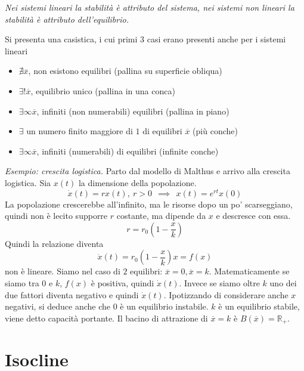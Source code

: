 \textit{Nei sistemi lineari la stabilità è attributo del sistema, nei sistemi non lineari la stabilità è attributo dell'equilibrio.}

Si presenta una casistica, i cui primi $3$ casi erano presenti anche per i sistemi lineari
\begin{itemize}
	\item $\nexists \overline{x}$, non esistono equilibri (pallina su superficie obliqua)
	\item $\exists !\overline{x}$, equilibrio unico (pallina in una conca)
	\item $\exists \infty \overline{x}$, infiniti (non numerabili) equilibri (pallina in piano)
	\item $\exists $ un numero finito maggiore di $1$ di equilibri $\overline{x}$ (più conche)
	\item $\exists \infty \overline{x}$, infiniti (numerabili) di equilibri (infinite conche)
\end{itemize}

\textit{Esempio: crescita logistica. }Parto dal modello di Malthus e arrivo alla crescita logistica. Sia $x(t)$ la dimensione della popolazione.
\begin{equation*}
	\dot{x}(t) =rx(t) ,\ r >0\ \ \implies \ \ x(t) =e^{rt} x(0)
\end{equation*}
La popolazione crescerebbe all'infinito, ma le risorse dopo un po' scarseggiano, quindi non è lecito supporre $r$ costante, ma dipende da $x$ e descresce con essa.
\begin{equation*}
	r=r_0\left(1-\frac{x}{k}\right)
\end{equation*}
Quindi la relazione diventa
\begin{equation*}
	\dot{x}(t) =r_0\left(1-\frac{x}{k}\right) x=f(x)
\end{equation*}
non è lineare. Siamo nel caso di $2$ equilibri: $\overline{x} =0,\overline{x} =k$. Matematicamente se siamo tra $0$ e $k$, $f(x)$ è positiva, quindi $\dot{x}(t)$. Invece se siamo oltre $k$ uno dei due fattori diventa negativo e quindi $\dot{x}(t)$. Ipotizzando di considerare anche $x$ negativi, si deduce anche che $0$ è un equilibrio instabile. $k$ è un equilibrio stabile, viene detto capacità portante. Il bacino di attrazione di $\overline{x} =k$ è $B(\overline{x}) =\mathbb{R}_{+}$.

\section{Isocline}

